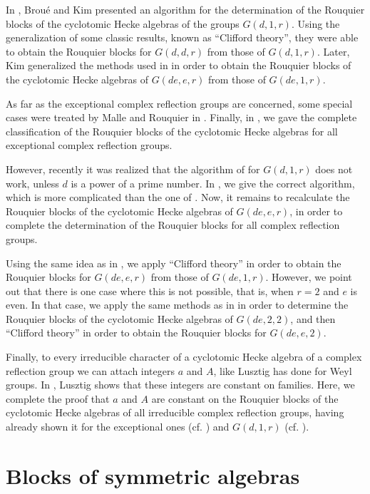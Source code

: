 \documentclass[10pt,a4paper,titlepage]{article}
\begin{document}
In \cite{BK}, Brou\'{e} and Kim presented an algorithm for the determination of the Rouquier blocks of the cyclotomic Hecke algebras of the groups $G(d,1,r)$. Using the generalization of some classic results, known as ``Clifford theory'',  they were able to obtain the Rouquier blocks for $G(d,d,r)$ from those of $G(d,1,r)$. Later, Kim \cite{Kim} generalized the methods used in \cite{BK} in order to obtain the Rouquier blocks of the cyclotomic Hecke algebras of $G(de,e,r)$ from those of $G(de,1,r)$.

As far as the exceptional complex reflection groups are concerned,  some special cases were treated  by Malle and Rouquier in \cite{MaRo}. Finally, in \cite{Chlou}, we gave the complete classification of the  Rouquier blocks of the cyclotomic Hecke algebras for all exceptional complex reflection groups. 

However, recently it was realized that the algorithm of \cite{BK} for $G(d,1,r)$ does not work, unless $d$ is a power of a prime number. 
In \cite{Chlou2}, we give the correct algorithm, which is more complicated than the one of \cite{BK}. 
Now, it remains to recalculate the Rouquier blocks of the cyclotomic Hecke algebras of $G(de,e,r)$, in order to complete the determination of the Rouquier blocks for all complex reflection groups.  

Using the same idea as in \cite{Kim}, we apply ``Clifford theory'' in order to obtain the Rouquier blocks for $G(de,e,r)$ from those of $G(de,1,r)$. However, we point out that there is one case where this is not possible, that is, when $r=2$ and $e$ is even. In that case, we apply the same methods as in \cite{Chlou} in order to determine the Rouquier blocks of the cyclotomic Hecke algebras of $G(de,2,2)$, and then ``Clifford theory'' in order to obtain the Rouquier blocks  for $G(de,e,2)$.

Finally, to every irreducible character of a cyclotomic Hecke algebra of a complex reflection group we can attach integers $a$ and $A$, like Lusztig has done for Weyl groups. In \cite{Lu2}, Lusztig shows that these integers are constant on families. Here, we complete the proof that $a$ and $A$ are constant on the Rouquier blocks of the cyclotomic Hecke algebras of all irreducible complex reflection groups, having already shown it for the exceptional ones (cf. \cite{ChDeg}) and $G(d,1,r)$ (cf. \cite{Chlou2}).



\section {Blocks of symmetric algebras}
\end{document}
